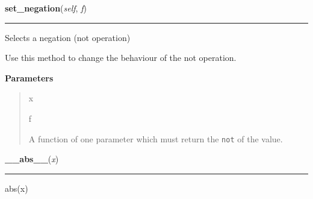     \label{peach:fuzzy:fuzzy:FuzzySet:set_negation}

    \vspace{0.5ex}

    \begin{boxedminipage}{\textwidth}

    \raggedright \textbf{set\_negation}(\textit{self}, \textit{f})

    \vspace{-1.5ex}

    \rule{\textwidth}{0.5\fboxrule}

Selects a negation (not operation)

Use this method to change the behaviour of the not operation.
    \vspace{1ex}

      \textbf{Parameters}
      \begin{quote}
        \begin{Ventry}{x}

          \item[f]


A function of one parameter which must return the \texttt{not} of the
value.
        \end{Ventry}

      \end{quote}

    \vspace{1ex}

    \end{boxedminipage}

    \label{numpy:ndarray:__abs__}

    \vspace{0.5ex}

    \begin{boxedminipage}{\textwidth}

    \raggedright \textbf{\_\_abs\_\_}(\textit{x})

    \vspace{-1.5ex}

    \rule{\textwidth}{0.5\fboxrule}

abs(x)
    \vspace{1ex}

    \end{boxedminipage}

